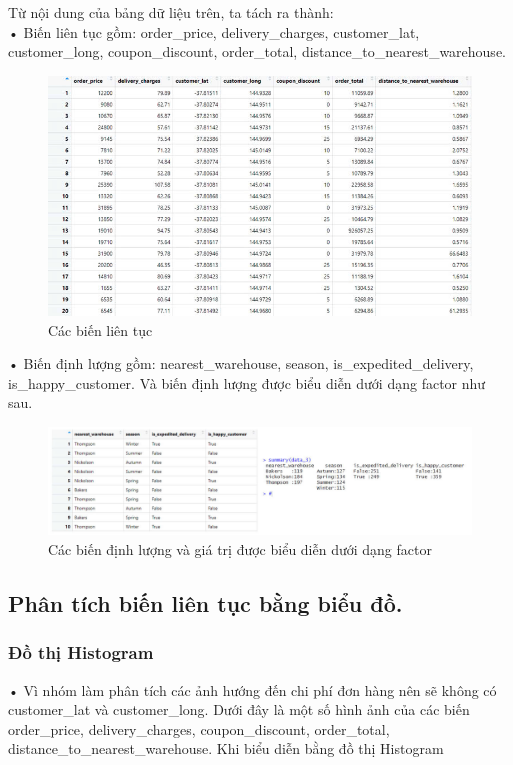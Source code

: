 Từ nội dung của bảng dữ liệu trên, ta tách ra thành:\\
•  Biến liên tục gồm: order\_price, delivery\_charges, customer\_lat, customer\_long, coupon\_discount, order\_total, distance\_to\_nearest\_warehouse.
 \begin{figure}[H]
    \centering
    \includegraphics[width=0.9\linewidth]{graphics/bang3.jpg}
    \caption{Các biến liên tục}
   
\end{figure}
•  Biến định lượng gồm: nearest\_warehouse, season, is\_expedited\_delivery, is\_happy\_customer. Và biến định lượng được biểu diễn dưới dạng factor như sau.
\begin{figure}[H]
    \centering
    \includegraphics[width=0.9\linewidth]{graphics/bang6.jpg}
    \caption{Các biến định lượng và giá trị được biểu diễn dưới dạng factor}
   
\end{figure}
\subsection{Phân tích biến liên tục bằng biểu đồ.}
\subsubsection{Đồ thị Histogram}
•	Vì nhóm làm phân tích các ảnh hướng đến chi phí đơn hàng nên sẽ không có customer\_lat và customer\_long. Dưới đây là một số hình ảnh của các biến order\_price, delivery\_charges, coupon\_discount, order\_total, distance\_to\_nearest\_warehouse. Khi biểu diễn bằng đồ thị Histogram

